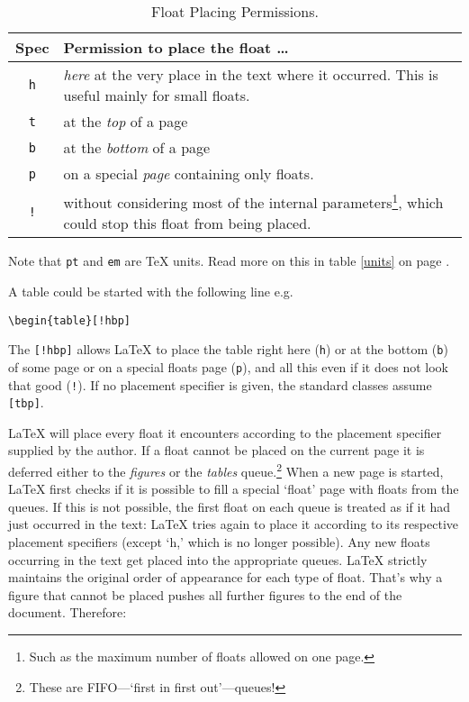\begin{table}[!bp]
\caption{Float Placing Permissions.}\label{tab:permiss}
\noindent \begin{minipage}{\textwidth}
\medskip
\begin{center}
\begin{tabular}{@{}cp{10cm}@{}}
Spec&Permission to place the float \ldots\\
\hline
\rule{0pt}{1.05em}\texttt{h} & \emph{here} at the very place in the text
  where it occurred.  This is useful mainly for small floats.\\[0.3ex]
\texttt{t} & at the \emph{top} of a page\\[0.3ex]
\texttt{b} & at the \emph{bottom} of a page\\[0.3ex]
\texttt{p} & on a special \emph{page} containing only floats.\\[0.3ex]
\texttt{!} & without considering most of the  internal parameters\footnote{Such as the
    maximum number of floats allowed  on one page.}, which could stop this
  float from being placed.
\end{tabular}
\end{center}
Note that \texttt{pt} and \texttt{em} are \TeX{} units. Read more
on this in table \ref{units} on page \pageref{units}.
\end{minipage}
\end{table}

A table could be started with the following line e.g.{}
\begin{code}
\verb|\begin{table}[!hbp]|
\end{code}
\noindent The  \verb|[!hbp]| allows \LaTeX{} to 
place the table right here (\texttt{h}) or at the bottom (\texttt{b}) 
of some page
or on a special floats page (\texttt{p}), and all this even if it does not
look that good (\texttt{!}). If no placement specifier is given, the standard
classes assume \verb|[tbp]|.

\LaTeX{} will place every float it encounters according to the
placement specifier supplied by the author. If a float cannot be
placed on the current page it is deferred either to the
\emph{figures} or the \emph{tables} queue.\footnote{These are FIFO---`first in first out'---queues!}  When a new page is started,
\LaTeX{} first checks if it is possible to fill a special `float'
page with floats from the queues. If this is not possible, the first
float on each queue is treated as if it had just occurred in the
text: \LaTeX{} tries again to place it according to its
respective placement specifiers (except `h,' which is no longer
possible).  Any new floats occurring in the text get placed into the
appropriate queues. \LaTeX{} strictly maintains the original order of
appearance for each type of float. That's why a figure that cannot
be placed pushes all further figures to the end of the document.
Therefore:

